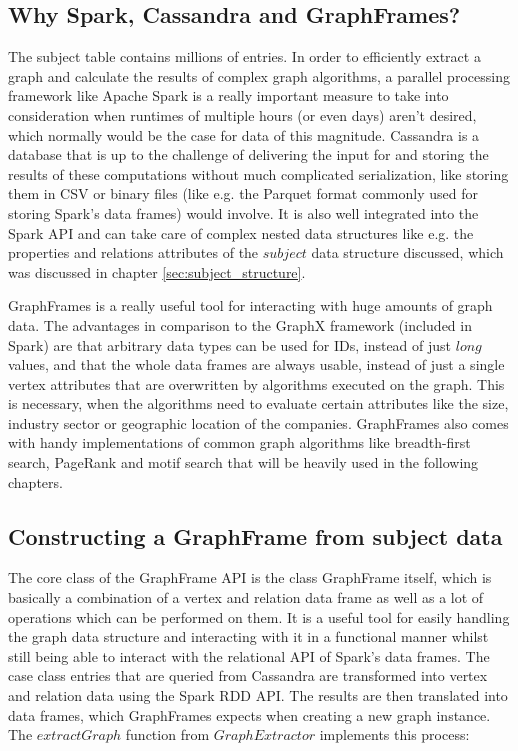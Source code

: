 \documentclass[
        a4paper,     %
        titlepage,   %
        oneside,     %
        parskip      %
]{scrartcl}          %
\begin{document}
    \subsection{Why Spark, Cassandra and GraphFrames?}
    The subject table contains millions of entries. In order to efficiently extract
    a graph and calculate the results of complex graph algorithms, a parallel processing
    framework like Apache Spark is a really important measure to take into consideration when runtimes
    of multiple hours (or even days) aren't desired, which normally would be the case for data of this magnitude.
    Cassandra is a database that is up to the challenge of delivering the input for and storing the results of
    these computations without much complicated serialization, like storing them
    in CSV or binary files (like e.g. the Parquet format commonly used for storing Spark's data frames) would involve.
    It is also well integrated into the Spark API and can take care of complex nested
    data structures like e.g. the properties and relations attributes of the $subject$
    data structure discussed, which was discussed in chapter \ref{sec:subject_structure}.

    GraphFrames is a really useful tool for interacting with huge amounts of graph
    data. The advantages in comparison to the GraphX framework (included in Spark) are that arbitrary data types
    can be used for IDs, instead of just $long$ values, and that the whole data frames
    are always usable, instead of just a single vertex attributes that are overwritten
    by algorithms executed on the graph. This is necessary, when the algorithms need to
    evaluate certain attributes like the size, industry sector or geographic location of the companies.
    GraphFrames also comes with handy implementations
    of common graph algorithms like breadth-first search, PageRank and motif search
    that will be heavily used in the following chapters.

    \subsection{Constructing a GraphFrame from subject data}
    \label{sec:graphframe_construction}
    The core class of the GraphFrame API is the class GraphFrame itself, which
    is basically a combination of a vertex and relation data frame as well as a
    lot of operations which can be performed on them. It is a useful tool for
    easily handling the graph data structure and interacting with it in a functional
    manner whilst still being able to interact with the relational API of Spark's data frames.
    The case class entries that are queried from Cassandra are transformed into vertex
    and relation data using the Spark RDD API. The results are then translated into
    data frames, which GraphFrames expects when creating a new graph instance.\\
    The $extractGraph$ function from $GraphExtractor$ implements this process:
\end{document}
